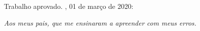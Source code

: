 \documentclass[
12pt,				%
openright,			%
twoside,			%
a4paper,			%
english,			%
french,				%
spanish,			%
brazil				%
]{abntex2}
\begin{document}

%
% 
%
\begin{folhadeaprovacao}
	
	\begin{center}
		{\ABNTEXchapterfont\large\imprimirautor}
		
		\vspace*{\fill}\vspace*{\fill}
		\begin{center}
			\ABNTEXchapterfont\bfseries\Large\imprimirtitulo
		\end{center}
		\vspace*{\fill}
		
		\hspace{.45\textwidth}
		\begin{minipage}{.5\textwidth}
			\imprimirpreambulo
		\end{minipage}%
		\vspace*{\fill}
	\end{center}
	
	Trabalho aprovado. \imprimirlocal, 01 de março de 2020:
	
	
	\begin{center}
		\vspace*{0.5cm}
		{\large\imprimirlocal}
		\par
		{\large\imprimirdata}
		\vspace*{1cm}
	\end{center}
	
\end{folhadeaprovacao}

\begin{dedicatoria}
	\vspace*{\fill}
	\centering
	\noindent
	\textit{Aos meus pais, que me ensinaram a apreender com meus erros.} \vspace*{\fill}
\end{dedicatoria}
\end{document}
